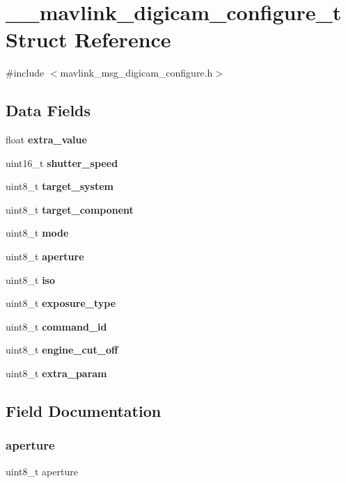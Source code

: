 \section{\+\_\+\+\_\+mavlink\+\_\+digicam\+\_\+configure\+\_\+t Struct Reference}
\label{struct____mavlink__digicam__configure__t}


{\ttfamily \#include $<$mavlink\+\_\+msg\+\_\+digicam\+\_\+configure.\+h$>$}

\subsection*{Data Fields}
\begin{DoxyCompactItemize}
\item 
float \textbf{ extra\+\_\+value}
\item 
uint16\+\_\+t \textbf{ shutter\+\_\+speed}
\item 
uint8\+\_\+t \textbf{ target\+\_\+system}
\item 
uint8\+\_\+t \textbf{ target\+\_\+component}
\item 
uint8\+\_\+t \textbf{ mode}
\item 
uint8\+\_\+t \textbf{ aperture}
\item 
uint8\+\_\+t \textbf{ iso}
\item 
uint8\+\_\+t \textbf{ exposure\+\_\+type}
\item 
uint8\+\_\+t \textbf{ command\+\_\+id}
\item 
uint8\+\_\+t \textbf{ engine\+\_\+cut\+\_\+off}
\item 
uint8\+\_\+t \textbf{ extra\+\_\+param}
\end{DoxyCompactItemize}


\subsection{Field Documentation}
\mbox{\label{struct____mavlink__digicam__configure__t_a50f861de717a8cb7ecf39424b1c14d8b}} 
\subsubsection{aperture}
{\footnotesize\ttfamily uint8\+\_\+t aperture}

